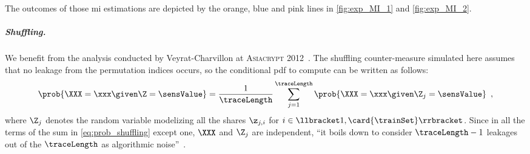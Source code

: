 The outcomes of those \gls{mi} estimations are depicted by the orange, blue and pink lines in \autoref{fig:exp_MI_1} and \autoref{fig:exp_MI_2}.

\subparagraph{Shuffling.}
We benefit from the analysis conducted by Veyrat-Charvillon \etal{} at \textsc{Asiacrypt} 2012~\cite{veyrat-charvillon_shuffling_2012}. 
The shuffling counter-measure simulated here assumes that no leakage from the permutation indices occurs, so the conditional \gls{pdf} to compute can be written as follows:
\begin{equation}
	\prob{\XXX = \xxx \given \Z = \sensValue} = \frac{1}{\traceLength}\sum_{j=1}^{\traceLength} \prob{\XXX = \xxx \given \Z_{j} = \sensValue} \enspace ,
	\label{eq:prob_shuffling}
\end{equation}
where \(\Z_j\) denotes the random variable modelizing all the shares \(\z_{j,i}\) for \(i \in \llbracket 1, \card{\trainSet} \rrbracket\).
Since in all the terms of the sum in \autoref{eq:prob_shuffling} except one, \(\XXX\) and \(\Z_j\) are independent, ``it boils down to consider \(\traceLength-1\) leakages out of the \(\traceLength\) as algorithmic noise''~\cite{veyrat-charvillon_shuffling_2012}.